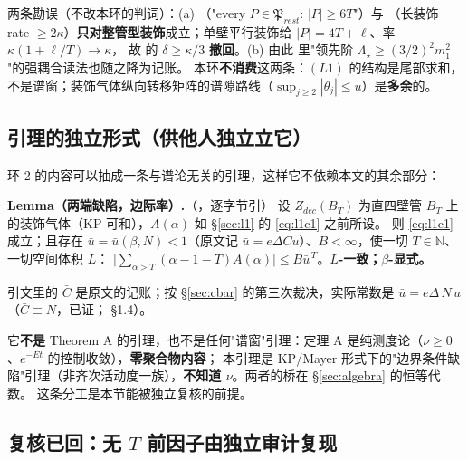 \LM{} 两条勘误（不改本环的判词）：(a) （"every $P\in\mathfrak{P}_{rest}$: $|P|\ge6T$"）与 
（长装饰 rate $\ge2\kappa$）\textbf{只对整管型装饰}成立；单壁平行装饰给 $|P|=4T+\ell$、率 $\kappa(1+\ell/T)\to\kappa$，
故  的 $\delta\ge\kappa/3$ \textbf{撤回}。(b) 由此  里"领先阶 $\Lambda_\star\ge(3/2)^2m_1^2$"的强耦合读法也随之降为记账。
本环\textbf{不消费}这两条：$(L1)$ 的结构是尾部求和，不是谱窗；装饰气体纵向转移矩阵的谱隙路线（$\sup_{j\ge2}|\theta_j|\le u$）是\textbf{多余}的。

\subsection{引理的独立形式（供他人独立立它）}

环 2 的内容可以抽成一条与谱论无关的引理，这样它不依赖本文的其余部分：

\begin{quotebox}
\textbf{Lemma（两端缺陷，边际率）.}（，逐字节引）
设 $Z_{dec}(B_T)$ 为直四壁管 $B_T$ 上的装饰气体（KP 可和），$A(\alpha)$ 如 \S\ref{sec:l1} 的 \eqref{eq:l1c1} 之前所设。
则 \eqref{eq:l1c1} 成立；且存在 $\bar u=\bar u(\beta,N)<1$（原文记 $\bar u=e\Delta\bar C u$）、$B<\infty$，使一切 $T\in\mathbb{N}$、一切空间体积 $L$：
$\bigl|\sum_{\alpha>T}(\alpha-1-T)A(\alpha)\bigr|\le B\bar u^{\,T}$。\textbf{$L$-一致；$\beta$-显式。}
\par\smallskip
{\footnotesize 引文里的 $\bar C$ 是原文的记账；按 \S\ref{sec:cbar} 的第三次裁决，实际常数是 $\bar u=e\Delta\,N\,u$（$\bar C\equiv N$，已证； \S1.4）。}
\end{quotebox}

它\textbf{不是} Theorem A 的引理，也不是任何"谱窗"引理：定理 A 是纯测度论（$\nu\ge0$、$e^{-Et}$ 的控制收敛），\textbf{零聚合物内容}；
本引理是 KP/Mayer 形式下的"边界条件缺陷"引理（非齐次活动度一族），\textbf{不知道 $\nu$}。两者的桥在 \S\ref{sec:algebra} 的恒等代数。
这条分工是本节能被独立复核的前提。\LT
{}

\subsection{复核已回：无 $T$ 前因子由独立审计复现}\label{sec:l1audit}

